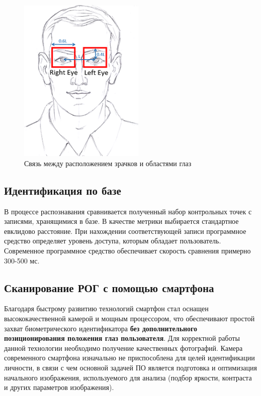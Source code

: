 \documentclass[10pt, a5paper]{article}
\begin{document}
\begin{center}
\begin{figure}[h!]
  \centering
  \includegraphics[width=6cm]{w_09_2018_Kharkevich3.png}
  \caption{Связь между расположением зрачков и областями глаз}
  \label{fig:Kharkevich3}
\end{figure}
\end{center} 

\subsection*{Идентификация по базе}
В процессе распознавания сравнивается полученный набор контрольных точек с записями, хранящимися в базе. В качестве метрики выбирается стандартное евклидово расстояние. При нахождении соответствующей записи программное средство определяет уровень доступа, которым обладает пользователь. Современное программное средство обеспечивает скорость сравнения примерно 300-500 мс.

\subsection*{Сканирование РОГ с помощью смартфона}
Благодаря быстрому развитию технологий смартфон стал оснащен высококачественной камерой и мощным процессором, что обеспечивают простой захват биометрического идентификатора \textbf{без дополнительного позиционирования положения глаз пользователя}. Для корректной работы данной технологии необходимо получение качественных фотографий. Камера современного смартфона изначально не приспособлена для целей идентификации личности, в связи с чем основной задачей ПО является подготовка и оптимизация начального изображения, используемого для анализа (подбор яркости, контраста и других параметров изображения).
\end{document}

